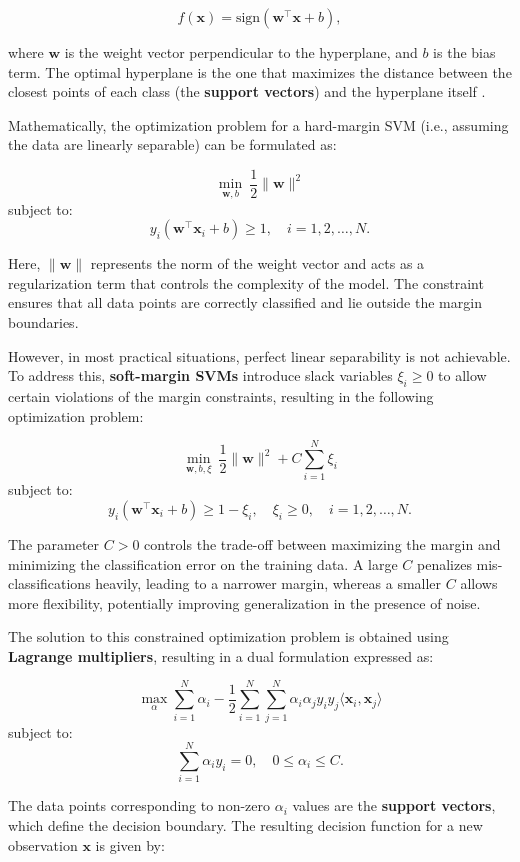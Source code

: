 \[
f(\mathbf{x}) = \text{sign}(\mathbf{w}^\top \mathbf{x} + b),
\]

where \(\mathbf{w}\) is the weight vector perpendicular to the hyperplane, and \(b\) is the bias term. The optimal hyperplane is the one that maximizes the distance between the closest points of each class (the \textbf{support vectors}) and the hyperplane itself \citep{cortes1995}.

Mathematically, the optimization problem for a hard-margin SVM (i.e., assuming the data are linearly separable) can be formulated as:

\[
\min_{\mathbf{w}, b} \ \frac{1}{2} \|\mathbf{w}\|^2
\] subject to: \[
y_i (\mathbf{w}^\top \mathbf{x}_i + b) \geq 1, \quad i = 1, 2, \ldots, N.
\]

Here, \(\|\mathbf{w}\|\) represents the norm of the weight vector and acts as a regularization term that controls the complexity of the model. The constraint ensures that all data points are correctly classified and lie outside the margin boundaries.

However, in most practical situations, perfect linear separability is not achievable. To address this, \textbf{soft-margin SVMs} introduce slack variables \(\xi_i \geq 0\) to allow certain violations of the margin constraints, resulting in the following optimization problem:

\[
\min_{\mathbf{w}, b, \xi} \ \frac{1}{2} \|\mathbf{w}\|^2 + C \sum_{i=1}^{N} \xi_i
\] subject to: \[
y_i (\mathbf{w}^\top \mathbf{x}_i + b) \geq 1 - \xi_i, \quad \xi_i \geq 0, \quad i = 1, 2, \ldots, N.
\]

The parameter \(C > 0\) controls the trade-off between maximizing the margin and minimizing the classification error on the training data. A large \(C\) penalizes mis-classifications heavily, leading to a narrower margin, whereas a smaller \(C\) allows more flexibility, potentially improving generalization in the presence of noise.

The solution to this constrained optimization problem is obtained using \textbf{Lagrange multipliers}, resulting in a dual formulation expressed as:

\[
\max_{\alpha} \sum_{i=1}^{N} \alpha_i - \frac{1}{2} \sum_{i=1}^{N}\sum_{j=1}^{N} \alpha_i \alpha_j y_i y_j \langle \mathbf{x}_i, \mathbf{x}_j \rangle
\] subject to: \[
\sum_{i=1}^{N} \alpha_i y_i = 0, \quad 0 \leq \alpha_i \leq C.
\]

The data points corresponding to non-zero \(\alpha_i\) values are the \textbf{support vectors}, which define the decision boundary. The resulting decision function for a new observation \(\mathbf{x}\) is given by:

